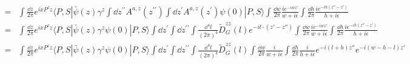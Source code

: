 \documentclass{article}
\newcommand{\mm}[1]{\frac{\dd^4#1}{(2\pi)^4}}
\begin{document}
{\begin{align*}
		= & \int \frac{\dd z}{2 \pi} e^{i x P^{z} z}\langle P, S|\bar{\psi}(z) \gamma^z \int \dd z^{\prime\prime} A^{a,z}\left(z^{\prime\prime}\right)\int \dd z^{\prime} A^{a,z}\left(z^{\prime}\right)  \psi(0)| P, S\rangle\int\frac{\dd w}{2\pi}\frac{ie^{-iwz' }}{w+i\epsilon}\int\frac{\dd h}{2\pi}\frac{ie^{-ih(z''-z') }}{h+i\epsilon} \\
		= & \int \frac{\dd z}{2 \pi} e^{i x P^{z} z}\langle P, S|\bar{\psi}(z) \gamma^z   \psi(0)| P, S\rangle\int \dd z^{\prime} \int \dd z^{\prime\prime} \int\mm{l}\tilde D_G^{zz}(l)e^{-il\cdot(z'-z'')}\int\frac{\dd w}{2\pi}\frac{ie^{-iwz' }}{w+i\epsilon}\int\frac{\dd h}{2\pi}\frac{ie^{-ih(z''-z') }}{h+i\epsilon}                   \\
		= & \int \frac{\dd z}{2 \pi} e^{i x P^{z} z}\langle P, S|\bar{\psi}(z) \gamma^z   \psi(0)| P, S\rangle\int \dd z^{\prime} \int \dd z^{\prime\prime} \int\mm{l}\tilde D_G^{zz}(l)\int\frac{\dd w}{2\pi}\frac{i}{w+i\epsilon}\int\frac{\dd h}{2\pi}\frac{i}{h+i\epsilon}e^{-i(l+h)z''}e^{-i(w-h-l)z'}
	\end{align*}
}


\clearpage
\end{document}
